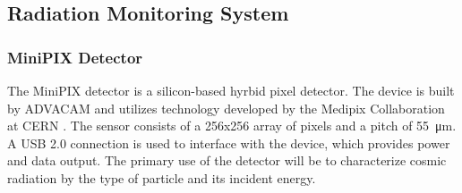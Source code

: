 \subsection{Radiation Monitoring System}
\label{sec:RadiationDesign}

\subsubsection{MiniPIX Detector}
The MiniPIX detector is a silicon-based hyrbid pixel detector. The device is built by ADVACAM \cite{Advacam}  and utilizes technology developed by the Medipix Collaboration at CERN \cite{Medipix}. The sensor consists of a \num{256}x\num{256} array of pixels and a pitch of \SI{55}{\micro\meter}. A USB 2.0 connection is used to interface with the device, which provides power and data output. The primary use of the detector will be to characterize cosmic radiation by the type of particle and its incident energy.


